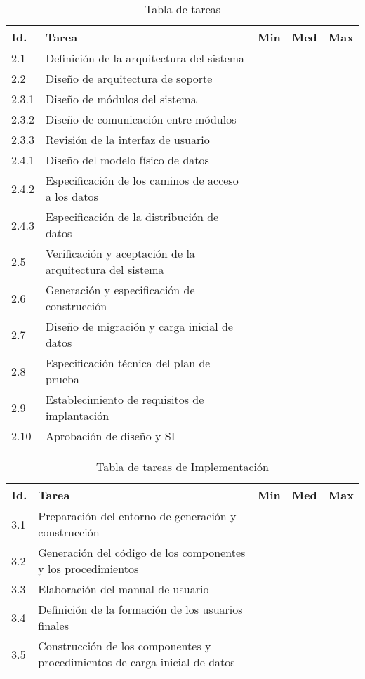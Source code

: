 \documentclass[11pt,a4paper,spanish,twoside]{report}
\begin{document}
\begin{table}[!h]
\centering
  \begin{tabular}{|p{0.8cm}||p{8cm}||p{0.75cm}|p{0.75cm}|p{0.75cm}|}
    \hline
    \textbf{Id.} & \textbf{Tarea} & \textbf{Min} &
    \textbf{Med} & \textbf{Max}\\
    \hline
    2.1 & Definición de la arquitectura del sistema & & & \\
    \hline
    2.2 & Diseño de arquitectura de soporte & & & \\
    \hline
    2.3.1 & Diseño de módulos del sistema & & & \\
    \hline
    2.3.2 & Diseño de comunicación entre módulos & & & \\
    \hline
    2.3.3 & Revisión de la interfaz de usuario & & & \\
    \hline
    2.4.1 & Diseño del modelo físico de datos & & & \\
    \hline
     2.4.2 & Especificación de los caminos de acceso a los datos & & & \\
    \hline
    2.4.3 & Especificación de la distribución de datos & & & \\
    \hline
    2.5 & Verificación y aceptación de la arquitectura del sistema & & & \\
    \hline
    2.6 & Generación y especificación de construcción & & & \\
    \hline
    2.7 & Diseño de migración y carga inicial de datos & & & \\
    \hline
    2.8 & Especificación técnica del plan de prueba & & & \\
    \hline
    2.9 & Establecimiento de requisitos de implantación & & & \\
    \hline
    2.10 & Aprobación de diseño y SI & & & \\
    \hline
  \end{tabular}
  \caption{Tabla de tareas} \label{Tab:tareas2}
\end{table}

\begin{table}[!h]
\centering
  \begin{tabular}{|p{0.8cm}||p{8cm}||p{0.75cm}|p{0.75cm}|p{0.75cm}|}
    \hline
    \textbf{Id.} & \textbf{Tarea} & \textbf{Min} &
    \textbf{Med} & \textbf{Max}\\
    \hline
    3.1 & Preparación del entorno de generación y construcción &  &  & \\
    \hline
    3.2 & Generación del código de los componentes y los procedimientos & & &\\
    \hline
    3.3 & Elaboración del manual de usuario & & &\\
    \hline
    3.4 & Definición de la formación de los usuarios finales & & & \\
    \hline
    3.5 & Construcción de los componentes y procedimientos de carga inicial
    de datos & & &\\
    \hline
  \end{tabular}
  \caption{Tabla de tareas de Implementación} \label{Tab:tareas3}
\end{table}
\end{document}

